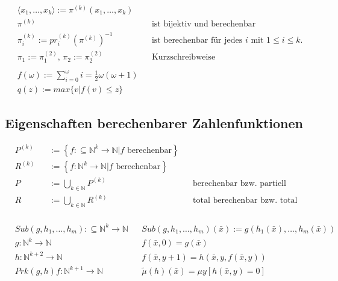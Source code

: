\documentclass[10pt,oneside,a4paper]{scrartcl}
\begin{document}

    \begin{align}
    &\langle x_1, \ldots, x_k\rangle := \pi^{(k)}(x_1, \ldots, x_k)\\
    &\pi^{(k)} && \text{ist bijektiv und berechenbar}\\
    &\pi_i^{(k)} := pr_i^{(k)}(\pi^{(k)})^{-1}
        && \text{ist berechenbar für jedes $i$ mit $1 \leq i \leq k$.}\\
    &\pi_1 := \pi_1^{(2)}\text{, }\pi_2 := \pi_2^{(2)}
        && \text{Kurzschreibweise}\nonumber\\
    \nonumber\\
    &f(\omega) := \sum_{i=0}^{\omega} i = \frac{1}{2} \omega (\omega+1)\\
    &q(z) := max\{v|f(v) \leq z\}
    \end{align}

\subsection{Eigenschaften berechenbarer Zahlenfunktionen}

    \begin{align}
    &P^{(k)} &&:= \left\{f :\subseteq\mathbb{N}^k\longrightarrow
        \mathbb{N} | f \text{ berechenbar}\right\}\\
    &R^{(k)} &&:= \left\{f :\mathbb{N}^k\longrightarrow
        \mathbb{N} | f \text{ berechenbar}\right\}\\
    &P &&:= \bigcup_{k\in\mathbb{N}} P^{(k)}
        && \text{berechenbar bzw. partiell rekursiv}\\
    &R &&:= \bigcup_{k\in\mathbb{N}} R^{(k)}
        && \text{total berechenbar bzw. total rekursiv}\\
    \end{align}

    \begin{align}
    &Sub(g, h_1, \ldots, h_m) :\subseteq\mathbb{N}^k\longrightarrow \mathbb{N}
        &&Sub(g, h_1, \ldots, h_m)(\bar{x}) := g(h_1(\bar{x}), \ldots,
            h_m(\bar{x}))\\
    &g:\mathbb{N}^{k}\longrightarrow \mathbb{N} && f(\bar{x}, 0) = g(\bar{x})\\
    &h:\mathbb{N}^{k+2}\longrightarrow \mathbb{N} && f(\bar{x}, y+1) = h(
        \bar{x}, y, f(\bar{x}, y))\\
    &Prk(g,h) f : \mathbb{N}^{k+1} \longrightarrow \mathbb{N}
        &&\tilde{\mu}(h)(\bar{x}) = \mu y \left[ h(\bar{x}, y) = 0 \right]
    \end{align}
\end{document}
